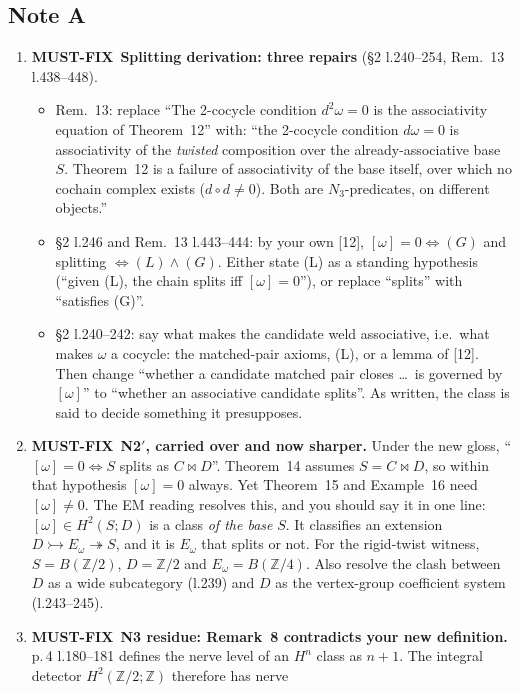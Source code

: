 \documentclass[11pt]{article}
\newcommand{\Z}{\mathbb{Z}}
\newcommand{\MF}{\textbf{MUST-FIX}}
\begin{document}
\subsection*{Note A}
\begin{enumerate}[label=\textbf{A\arabic*},leftmargin=*]
\item \MF\ \textbf{Splitting derivation: three repairs} (\S2 l.240--254, Rem.~13 l.438--448).
\begin{itemize}[leftmargin=1.2em]
\item[(a)] Rem.~13: replace ``The 2-cocycle condition $d^2\omega=0$ is the associativity equation of
Theorem~12'' with: ``the 2-cocycle condition $d\omega=0$ is associativity of the \emph{twisted}
composition over the already-associative base $S$. Theorem~12 is a failure of associativity of the
base itself, over which no cochain complex exists ($d\circ d\neq0$). Both are $N_3$-predicates, on
different objects.''
\item[(b)] \S2 l.246 and Rem.~13 l.443--444: by your own [12], $[\omega]=0\iff(G)$ and splitting
$\iff(L)\wedge(G)$. Either state (L) as a standing hypothesis (``given (L), the chain splits iff
$[\omega]=0$''), or replace ``splits'' with ``satisfies (G)''.
\item[(c)] \S2 l.240--242: say what makes the candidate weld associative, i.e.\ what makes $\omega$ a
cocycle: the matched-pair axioms, (L), or a lemma of [12]. Then change ``whether a candidate matched
pair closes \dots\ is governed by $[\omega]$'' to ``whether an associative candidate splits''. As
written, the class is said to decide something it presupposes.
\end{itemize}
\item \MF\ \textbf{N2$'$, carried over and now sharper.} Under the new gloss, ``$[\omega]=0\iff S$
splits as $C\bowtie D$''. Theorem~14 assumes $S=C\bowtie D$, so within that hypothesis $[\omega]=0$
always. Yet Theorem~15 and Example~16 need $[\omega]\neq0$. The EM reading resolves this, and you
should say it in one line: $[\omega]\in H^2(S;D)$ is a class \emph{of the base} $S$. It classifies an
extension $D\rightarrowtail E_\omega\twoheadrightarrow S$, and it is $E_\omega$ that splits or not.
For the rigid-twist witness, $S=B(\Z/2)$, $D=\Z/2$ and $E_\omega=B(\Z/4)$. Also resolve the clash
between $D$ as a wide subcategory (l.239) and $D$ as the vertex-group coefficient system (l.243--245).
\item \MF\ \textbf{N3 residue: Remark~8 contradicts your new definition.} p.\,4 l.180--181 defines
the nerve level of an $H^n$ class as $n+1$. The integral detector $H^2(\Z/2;\Z)$ therefore has nerve

\end{enumerate}
\end{document}
